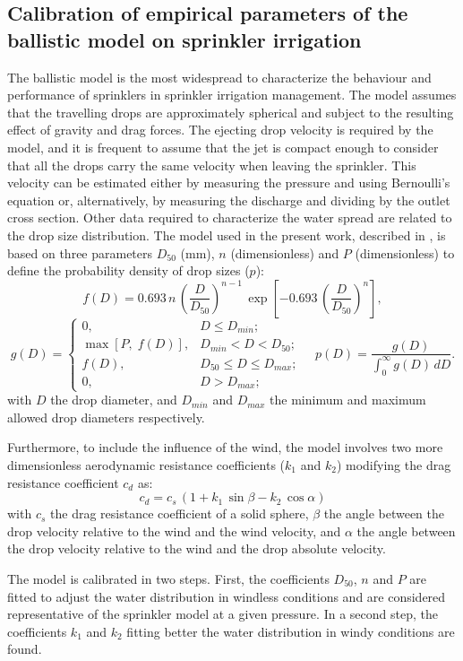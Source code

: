 \documentclass[review,authoryear]{elsarticle}
\newcommand{\EQ}[2]
{\begin{equation}#1\label{#2}\end{equation}}
\newcommand{\C}[1]{\left[#1\right]}
\newcommand{\PA}[1]{\left(#1\right)}
\begin{document}
\subsection{Calibration of empirical parameters of the ballistic model on
sprinkler irrigation}

The ballistic model \citep{Fukui80,Playan06} is the most widespread to characterize the behaviour and performance of sprinklers in sprinkler irrigation management. The model assumes that the travelling drops are approximately spherical and subject to the resulting effect of gravity and drag forces. The ejecting drop velocity is required by the model, and it is frequent to assume that the jet is compact enough to consider that all the drops carry the same velocity when leaving the sprinkler. This velocity can be estimated either by measuring the pressure and using Bernoulli's equation or, alternatively, by measuring the discharge and dividing by the outlet cross section. Other data required to characterize the water spread are related to the drop size distribution. The model used in the present work, described in \cite{Ouazaa14}, is based on three parameters $D_{50}$ (mm), $n$ (dimensionless) and $P$ (dimensionless) to define the probability density of drop sizes ($p$):
\[
	f(D)=0.693\,n\,\PA{\frac{D}{D_{50}}}^{n-1}
	\,\exp\C{-0.693\,\PA{\frac{D}{D_{50}}}^n},
\]
\EQ
{
	g(D)=\left\{\begin{array}{lc}0,&D\leq D_{min};\\
	\max[P,\;f(D)],&D_{min}<D<D_{50};\\f(D),&D_{50}\leq D\leq D_{max};\\
	0,&D>D_{max};\end{array}\right.\quad
	p(D)=\frac{g(D)}{\int_0^\infty g(D)\,dD}.
}{EqSprinklerDropSizes}
with $D$ the drop diameter, and $D_{min}$ and $D_{max}$ the minimum and maximum
allowed drop diameters respectively.

Furthermore, to include the influence of the wind, the model involves two more dimensionless aerodynamic resistance coefficients ($k_1$ and $k_2$) modifying the drag resistance coefficient $c_d$ as:
\EQ{c_d=c_s\,\PA{1+k_1\,\sin\beta-k_2\,\cos\alpha}}{EqSprinklerDrag}
with $c_s$ the drag resistance coefficient of a solid sphere, $\beta$ the angle
between the drop velocity relative to the wind and the wind velocity, and
$\alpha$ the angle between the drop velocity relative to the wind and the drop
absolute velocity.

The model is calibrated in two steps. First, the coefficients $D_{50}$, $n$ and $P$ are fitted to adjust the water distribution in windless conditions and are considered representative of the sprinkler model at a given pressure. In a second step, the coefficients $k_1$ and $k_2$ fitting better the water distribution in windy conditions are found.
\end{document}
